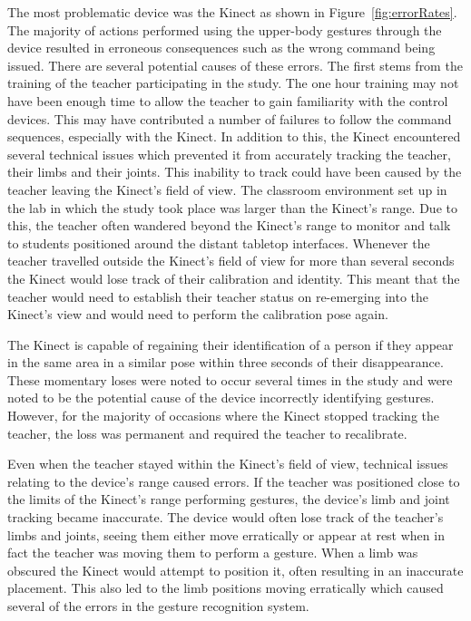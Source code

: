 \documentclass[link]{IWCOMP}
\begin{document}
The most problematic device was the Kinect as shown in Figure~\ref{fig:errorRates}.
The majority of actions performed using the upper-body gestures through the device resulted in erroneous consequences such as the wrong command being issued.
There are several potential causes of these errors.
The first stems from the training of the teacher participating in the study.
The one hour training may not have been enough time to allow the teacher to gain familiarity with the control devices.
This may have contributed a number of failures to follow the command sequences, especially with the Kinect.
In addition to this, the Kinect encountered several technical issues which prevented it from accurately tracking the teacher, their limbs and their joints.
This inability to track could have been caused by the teacher leaving the Kinect's field of view.
The classroom environment set up in the lab in which the study took place was larger than the Kinect's range.
Due to this, the teacher often wandered beyond the Kinect's range to monitor and talk to students positioned around the distant tabletop interfaces.
Whenever the teacher travelled outside the Kinect's field of view for more than several seconds the Kinect would lose track of their calibration and identity.
This meant that the teacher would need to establish their teacher status on re-emerging into the Kinect's view and would need to perform the calibration pose again.

The Kinect is capable of regaining their identification of a person if they appear in the same area in a similar pose within three seconds of their disappearance.
These momentary loses were noted to occur several times in the study and were noted to be the potential cause of the device incorrectly identifying gestures.
However, for the majority of occasions where the Kinect stopped tracking the teacher, the loss was permanent and required the teacher to recalibrate.

Even when the teacher stayed within the Kinect's field of view, technical issues relating to the device's range caused errors.
If the teacher was positioned close to the limits of the Kinect's range performing gestures, the device's limb and joint tracking became inaccurate.
The device would often lose track of the teacher's limbs and joints, seeing them either move erratically or appear at rest when in fact the teacher was moving them to perform a gesture.
When a limb was obscured the Kinect would attempt to position it, often resulting in an inaccurate placement.
This also led to the limb positions moving erratically which caused several of the errors in the gesture recognition system.
\end{document}
